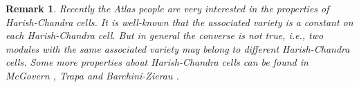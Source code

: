 \documentclass{amsart}[12pt]
\newtheorem{Rem}{Remark}[section]
\numberwithin{equation}{section}
\begin{document}
\begin{Rem}Recently the Atlas people are very interested in the properties of Harish-Chandra cells. It is well-known that the associated variety is a constant on each Harish-Chandra cell. But in general the converse is not true, i.e., two modules with the same associated variety may belong to different Harish-Chandra cells. Some more properties about Harish-Chandra cells can be found in McGovern \cite{Mc98}, Trapa \cite{Tr} and Barchini-Zierau \cite{BZ}.



\end{Rem}





%
%
%
%
%
\end{document}

